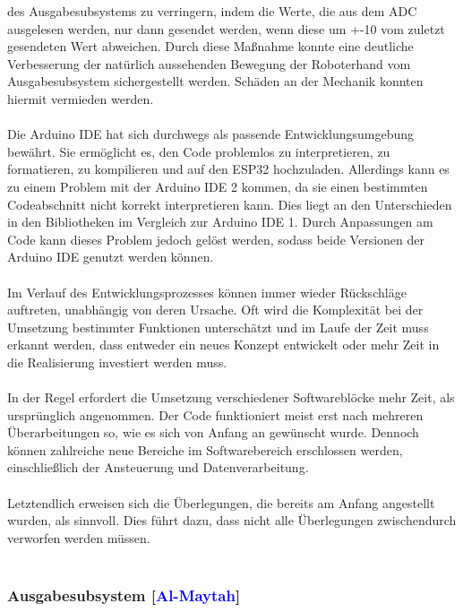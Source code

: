 \documentclass[titlepage,12pt,twoside]{article}
\begin{document}
des Ausgabesubsystems zu verringern, indem die Werte, die aus dem ADC 
ausgelesen werden, nur dann gesendet werden, wenn diese um +-10 vom zuletzt 
gesendeten Wert abweichen. Durch diese Maßnahme konnte eine deutliche 
Verbesserung der natürlich aussehenden Bewegung der Roboterhand vom 
Ausgabesubsystem sichergestellt werden. Schäden an der Mechanik konnten hiermit vermieden werden. \\
\\
Die Arduino IDE hat sich durchwegs als passende Entwicklungsumgebung bewährt. 
Sie ermöglicht es, den Code problemlos zu interpretieren, zu formatieren, zu 
kompilieren und auf den ESP32 hochzuladen. Allerdings kann es zu einem Problem 
mit der Arduino IDE 2 kommen, da sie einen bestimmten Codeabschnitt nicht 
korrekt interpretieren kann. Dies liegt an den Unterschieden in den Bibliotheken 
im Vergleich zur Arduino IDE 1. Durch Anpassungen am Code kann dieses Problem 
jedoch gelöst werden, sodass beide Versionen der Arduino IDE genutzt werden 
können. \\
\\
Im Verlauf des Entwicklungsprozesses können immer wieder Rückschläge auftreten, 
unabhängig von deren Ursache. Oft wird die Komplexität bei der Umsetzung 
bestimmter Funktionen unterschätzt und im Laufe der Zeit muss erkannt werden, 
dass entweder ein neues Konzept entwickelt oder mehr Zeit in die Realisierung 
investiert werden muss. \\
\\
In der Regel erfordert die Umsetzung verschiedener Softwareblöcke mehr Zeit, 
als ursprünglich angenommen. Der Code funktioniert meist erst nach mehreren 
Überarbeitungen so, wie es sich von Anfang an gewünscht wurde. Dennoch können 
zahlreiche neue Bereiche im Softwarebereich erschlossen werden, einschließlich 
der Ansteuerung und Datenverarbeitung. \\
\\
Letztendlich erweisen sich die Überlegungen, die bereits am Anfang angestellt 
wurden, als sinnvoll. Dies führt dazu, dass nicht alle Überlegungen 
zwischendurch verworfen werden müssen. \\
\\
\subsubsection{Ausgabesubsystem [\textcolor{blue}{Al-Maytah}]}
\end{document}
